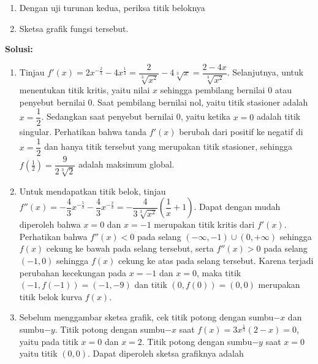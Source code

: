\documentclass{article}
\begin{document}
\begin{enumerate}
\begin{enumerate}
	 	\item Dengan uji turunan kedua, periksa titik beloknya
	 	\item Sketsa grafik fungsi tersebut.
	 \end{enumerate}
	 \textbf{Solusi:}
	 \begin{enumerate}
	 	\item Tinjau $f'(x)=2x^{-\frac{2}{3}}-4x^{\frac{1}{3}}=\dfrac{2}{\sqrt[3]{x^2}}-4\sqrt[3]{x}=\dfrac{2-4x}{\sqrt[3]{x^2}}$. Selanjutnya, untuk menentukan titik kritis, yaitu nilai $x$ sehingga pembilang bernilai 0 atau penyebut bernilai 0. Saat pembilang bernilai nol, yaitu titik stasioner adalah $x=\dfrac{1}{2}$. Sedangkan saat penyebut bernilai 0, yaitu ketika $x=0$ adalah titik singular. Perhatikan bahwa tanda $f'(x)$ berubah dari positif ke negatif di $x=\dfrac{1}{2}$ dan hanya titik tersebut yang merupakan titik stasioner, sehingga $f\left(\frac{1}{2}\right)=\dfrac{9}{2\sqrt[3]{2}}$ adalah maksimum global.
	 	\item Untuk mendapatkan titik belok, tinjau $f''(x)=-\dfrac{4}{3}x^{-\frac{5}{3}}-\dfrac{4}{3}x^{-\frac{2}{3}}=-\dfrac{4}{3\sqrt[3]{x^2}}\left(\dfrac{1}{x}+1\right)$. Dapat dengan mudah diperoleh bahwa $x=0$ dan $x=-1$ merupakan titik kritis dari $f'(x)$. Perhatikan bahwa $f''(x)<0$ pada selang $(-\infty,-1)\cup (0,+\infty)$ sehingga $f(x)$ cekung ke bawah pada selang tersebut, serta $f''(x)>0$ pada selang $(-1,0)$ sehingga $f(x)$ cekung ke atas pada selang tersebut. Karena terjadi perubahan kecekungan pada $x=-1$ dan $x=0$, maka titik $(-1,f(-1))=(-1,-9)$ dan titik $(0,f(0))=(0,0)$ merupakan titik belok kurva $f(x)$.
	 	\item Sebelum menggambar sketsa grafik, cek titik potong dengan sumbu$-x$ dan sumbu$-y$. Titik potong dengan sumbu$-x$ saat $f(x)=3x^{\frac{1}{3}}(2-x)=0$, yaitu pada titik $x=0$ dan $x=2$. Titik potong dengan sumbu$-y$ saat $x=0$ yaitu titik $(0,0)$. Dapat diperoleh sketsa grafiknya adalah 
	 	\begin{center}
\end{center}
\end{enumerate}
\end{enumerate}
\end{document}
